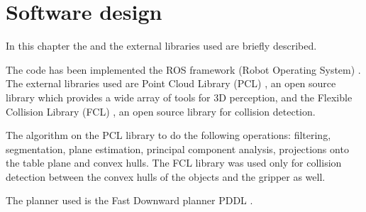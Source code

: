 \chapter{Software design}
\label{ch:software_design}
In this chapter the  and the  external libraries used are briefly described. 

The code has been implemented  the ROS framework (Robot Operating System) \citep{ROS}. 
The external libraries used are  Point Cloud Library (PCL) \citep{PCL}, an open source library which provides a wide array of tools for 3D perception, and the Flexible Collision Library (FCL) \citep{pan2012fcl}, an open source  library for collision detection.

The algorithm  on the PCL library  to do the following operations: filtering, segmentation, plane estimation, principal component analysis, projections onto the table plane and convex hulls.
The FCL library was used only for collision detection between the convex hulls of the objects and the gripper as well. 

The planner used is the Fast Downward planner \citep{helmert2006fast} PDDL .

 

